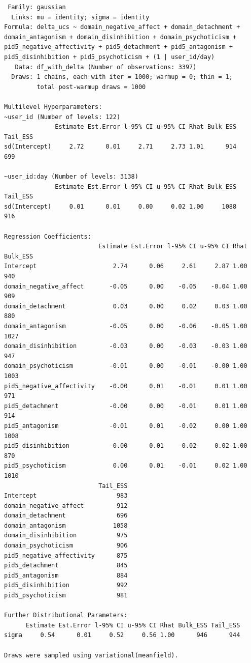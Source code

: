 \documentclass[
  11pt,
  a4paper,
  onecolumn]{article}
\begin{document}
\begin{verbatim}
 Family: gaussian 
  Links: mu = identity; sigma = identity 
Formula: delta_ucs ~ domain_negative_affect + domain_detachment + domain_antagonism + domain_disinhibition + domain_psychoticism + pid5_negative_affectivity + pid5_detachment + pid5_antagonism + pid5_disinhibition + pid5_psychoticism + (1 | user_id/day) 
   Data: df_with_delta (Number of observations: 3397) 
  Draws: 1 chains, each with iter = 1000; warmup = 0; thin = 1;
         total post-warmup draws = 1000

Multilevel Hyperparameters:
~user_id (Number of levels: 122) 
              Estimate Est.Error l-95% CI u-95% CI Rhat Bulk_ESS Tail_ESS
sd(Intercept)     2.72      0.01     2.71     2.73 1.01      914      699

~user_id:day (Number of levels: 3138) 
              Estimate Est.Error l-95% CI u-95% CI Rhat Bulk_ESS Tail_ESS
sd(Intercept)     0.01      0.01     0.00     0.02 1.00     1088      916

Regression Coefficients:
                          Estimate Est.Error l-95% CI u-95% CI Rhat Bulk_ESS
Intercept                     2.74      0.06     2.61     2.87 1.00      940
domain_negative_affect       -0.05      0.00    -0.05    -0.04 1.00      909
domain_detachment             0.03      0.00     0.02     0.03 1.00      880
domain_antagonism            -0.05      0.00    -0.06    -0.05 1.00     1027
domain_disinhibition         -0.03      0.00    -0.03    -0.03 1.00      947
domain_psychoticism          -0.01      0.00    -0.01    -0.00 1.00     1003
pid5_negative_affectivity    -0.00      0.01    -0.01     0.01 1.00      971
pid5_detachment              -0.00      0.00    -0.01     0.01 1.00      914
pid5_antagonism              -0.01      0.01    -0.02     0.00 1.00     1008
pid5_disinhibition           -0.00      0.01    -0.02     0.02 1.00      870
pid5_psychoticism             0.00      0.01    -0.01     0.02 1.00     1010
                          Tail_ESS
Intercept                      983
domain_negative_affect         912
domain_detachment              696
domain_antagonism             1058
domain_disinhibition           975
domain_psychoticism            906
pid5_negative_affectivity      875
pid5_detachment                845
pid5_antagonism                884
pid5_disinhibition             992
pid5_psychoticism              981

Further Distributional Parameters:
      Estimate Est.Error l-95% CI u-95% CI Rhat Bulk_ESS Tail_ESS
sigma     0.54      0.01     0.52     0.56 1.00      946      944

Draws were sampled using variational(meanfield). 
\end{verbatim}
\end{document}
